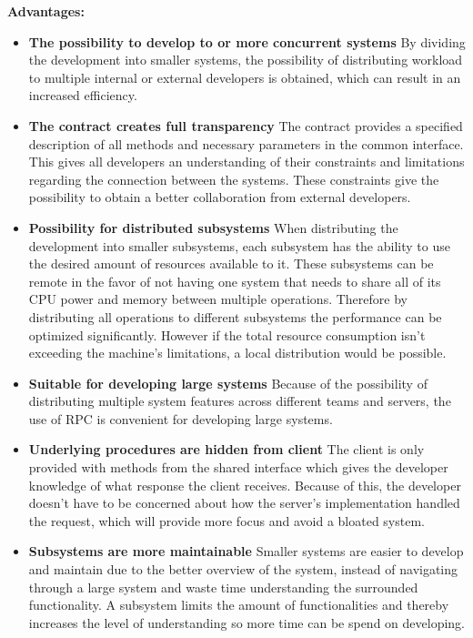 \documentclass[
]{article}
\begin{document}
\textbf{Advantages:}

\begin{itemize}
\item
  \textbf{The possibility to develop to or more concurrent systems} By
  dividing the development into smaller systems, the possibility of
  distributing workload to multiple internal or external developers is
  obtained, which can result in an increased efficiency.
\item
  \textbf{The contract creates full transparency} The contract provides
  a specified description of all methods and necessary parameters in the
  common interface. This gives all developers an understanding of their
  constraints and limitations regarding the connection between the
  systems. These constraints give the possibility to obtain a better
  collaboration from external developers.
\item
  \textbf{Possibility for distributed subsystems} When distributing the
  development into smaller subsystems, each subsystem has the ability to
  use the desired amount of resources available to it. These subsystems
  can be remote in the favor of not having one system that needs to
  share all of its CPU power and memory between multiple operations.
  Therefore by distributing all operations to different subsystems the
  performance can be optimized significantly. However if the total
  resource consumption isn't exceeding the machine's limitations, a
  local distribution would be possible.
\item
  \textbf{Suitable for developing large systems} Because of the
  possibility of distributing multiple system features across different
  teams and servers, the use of RPC is convenient for developing large
  systems.
\item
  \textbf{Underlying procedures are hidden from client} The client is
  only provided with methods from the shared interface which gives the
  developer knowledge of what response the client receives. Because of
  this, the developer doesn't have to be concerned about how the
  server's implementation handled the request, which will provide more
  focus and avoid a bloated system.
\item
  \textbf{Subsystems are more maintainable} Smaller systems are easier
  to develop and maintain due to the better overview of the system,
  instead of navigating through a large system and waste time
  understanding the surrounded functionality. A subsystem limits the
  amount of functionalities and thereby increases the level of
  understanding so more time can be spend on developing.
\end{itemize}
\end{document}

